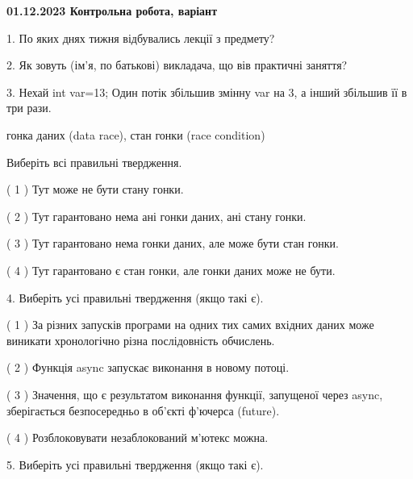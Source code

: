\documentclass[12pt, ukrainian]{article}
\begin{document}
\vspace{4mm}
\newpage
\begin {large}

\textbf{01.12.2023 Контрольна робота, варіант  }\par


{
1. По яких днях тижня відбувались лекції з предмету?



\vspace{5mm}
2. Як зовуть (ім'я, по батькові) викладача, що вів практичні заняття?



\vspace{5mm}
3. Нехай int var=13; Один потік збільшив змінну var на 3, а інший збільшив її в три рази.

гонка даних (data race), стан гонки (race condition)

Виберіть всі правильні твердження.\par
\vspace{2mm}
( 1 ) Тут може не бути стану гонки.%

( 2 ) Тут гарантовано нема ані гонки даних, ані стану гонки.%

( 3 ) Тут гарантовано нема гонки даних, але може бути стан гонки.%

( 4 ) Тут гарантовано є стан гонки, але гонки даних може не бути.%


\vspace{5mm}
4. Виберіть усі правильні твердження (якщо такі є).\par
\vspace{2mm}

( 1 ) За різних запусків програми на одних тих самих вхідних даних може виникати хронологічно різна послідовність обчислень.%

( 2 ) Функція async запускає виконання в новому потоці.%

( 3 ) Значення, що є результатом виконання функції, запущеної через async, зберігається безпосередньо в об’єкті ф’ючерса (future).%

( 4 ) Розблоковувати незаблокований м’ютекс можна.%


\vspace{5mm}
5. Виберіть усі правильні твердження (якщо такі є).\par
\vspace{2mm}

}
\end{large}
\end{document}
